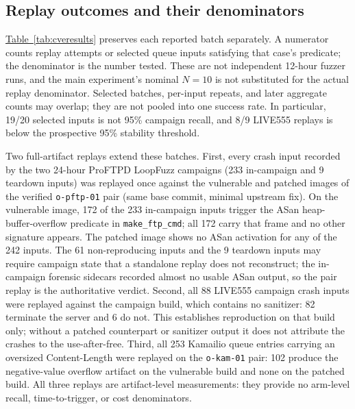 \documentclass[final,5p,times,number]{elsarticle}
\newcommand{\namedref}[2]{\hyperref[#2]{#1~\ref*{#2}}}
\begin{document}
\subsection{Replay outcomes and their denominators}
\namedref{Table}{tab:cveresults} preserves each reported batch separately. A numerator counts replay attempts or selected queue inputs satisfying that case's predicate; the denominator is the number tested. These are not independent 12-hour fuzzer runs, and the main experiment's nominal $N=10$ is not substituted for the actual replay denominator. Selected batches, per-input repeats, and later aggregate counts may overlap; they are not pooled into one success rate. In particular, 19/20 selected inputs is not 95\% campaign recall, and 8/9 LIVE555 replays is below the prospective 95\% stability threshold.

Two full-artifact replays extend these batches. First, every crash input recorded by the two 24-hour ProFTPD LoopFuzz campaigns (233 in-campaign and 9 teardown inputs) was replayed once against the vulnerable and patched images of the verified \texttt{o-pftp-01} pair (same base commit, minimal upstream fix). On the vulnerable image, 172 of the 233 in-campaign inputs trigger the ASan heap-buffer-overflow predicate in \texttt{make\_ftp\_cmd}; all 172 carry that frame and no other signature appears. The patched image shows no ASan activation for any of the 242 inputs. The 61 non-reproducing inputs and the 9 teardown inputs may require campaign state that a standalone replay does not reconstruct; the in-campaign forensic sidecars recorded almost no usable ASan output, so the pair replay is the authoritative verdict. Second, all 88 LIVE555 campaign crash inputs were replayed against the campaign build, which contains no sanitizer: 82 terminate the server and 6 do not. This establishes reproduction on that build only; without a patched counterpart or sanitizer output it does not attribute the crashes to the use-after-free. Third, all 253 Kamailio queue entries carrying an oversized Content-Length were replayed on the \texttt{o-kam-01} pair: 102 produce the negative-value overflow artifact on the vulnerable build and none on the patched build. All three replays are artifact-level measurements: they provide no arm-level recall, time-to-trigger, or cost denominators.
\end{document}
